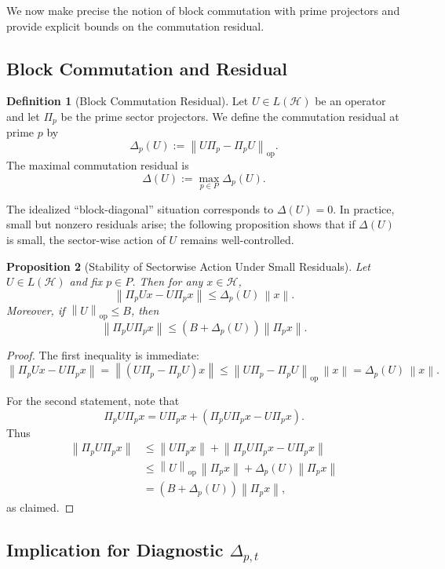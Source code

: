 \documentclass[11pt]{article}
\theoremstyle{definition}
\newtheorem{definition}{Definition}[section]
\theoremstyle{plain}
\newtheorem{proposition}[definition]{Proposition}
\theoremstyle{remark}
\newcommand{\Hcal}{\mathcal{H}}
\newcommand{\norm}[1]{\left\lVert #1 \right\rVert}
\begin{document}
We now make precise the notion of block commutation with prime projectors and provide explicit bounds on the commutation residual.

\subsection{Block Commutation and Residual}

\begin{definition}[Block Commutation Residual]
Let \(U \in L(\Hcal)\) be an operator and let \(\Pi_p\) be the prime sector projectors.
We define the commutation residual at prime \(p\) by
\[
  \Delta_p(U) := \norm{U \Pi_p - \Pi_p U}_{\mathrm{op}}.
\]
The maximal commutation residual is
\[
  \Delta(U) := \max_{p\in P} \Delta_p(U).
\]
\end{definition}

The idealized ``block-diagonal'' situation corresponds to \(\Delta(U) = 0\).
In practice, small but nonzero residuals arise; the following proposition shows that if \(\Delta(U)\) is small, the sector-wise action of \(U\) remains well-controlled.

\begin{proposition}[Stability of Sectorwise Action Under Small Residuals]
Let \(U \in L(\Hcal)\) and fix \(p\in P\).
Then for any \(x\in \Hcal\),
\[
  \norm{\Pi_p U x - U \Pi_p x}
  \le \Delta_p(U) \, \norm{x}.
\]
Moreover, if \(\norm{U}_{\mathrm{op}} \le B\), then
\[
  \norm{\Pi_p U \Pi_p x}
  \le (B + \Delta_p(U)) \norm{\Pi_p x}.
\]
\end{proposition}

\begin{proof}
The first inequality is immediate:
\[
  \norm{\Pi_p U x - U \Pi_p x}
  = \norm{(U \Pi_p - \Pi_p U)x}
  \le \norm{U \Pi_p - \Pi_p U}_{\mathrm{op}} \, \norm{x}
  = \Delta_p(U)\, \norm{x}.
\]

For the second statement, note that
\[
  \Pi_p U \Pi_p x
  = U \Pi_p x + (\Pi_p U \Pi_p x - U \Pi_p x).
\]
Thus
\begin{align*}
  \norm{\Pi_p U \Pi_p x}
  &\le \norm{U \Pi_p x} + \norm{\Pi_p U \Pi_p x - U \Pi_p x}\\
  &\le \norm{U}_{\mathrm{op}}\, \norm{\Pi_p x} + \Delta_p(U) \norm{\Pi_p x}\\
  &= (B + \Delta_p(U)) \norm{\Pi_p x},
\end{align*}
as claimed.
\end{proof}

\subsection{Implication for Diagnostic \(\Delta_{p,t}\)}
\end{document}
